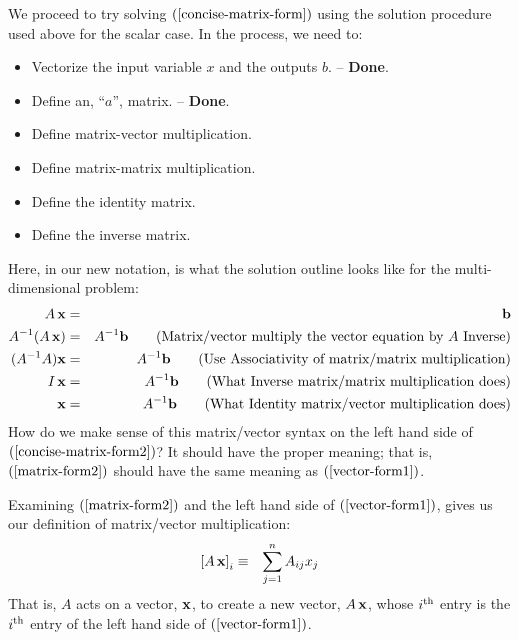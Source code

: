 \documentclass{article}
\begin{document}
We proceed to try solving $(\ref{concise-matrix-form})$ using the solution 
procedure used above for the scalar case. In the process, we need to:
\begin{itemize}
    \item{Vectorize the input variable $x$ and the outputs $b$. -- {\bf Done}.}
    \item{Define an, ``$a$'', matrix. -- {\bf Done}.}
    \item{Define matrix-vector multiplication.}
    \item{Define matrix-matrix multiplication.}
    \item{Define the identity matrix.}
    \item{Define the inverse matrix.}
\end{itemize}
Here, in our new notation, is what the solution outline looks like for the multi-dimensional problem:
\begin{eqnarray}
	A \, {\bf x} & = & {\bf b} \label{concise-matrix-form2}\\
	A^{-1} ( A \, {\bf x} ) & = & A^{-1} {\bf b} \quad \quad \text{(Matrix/vector multiply the vector equation by $A$ Inverse)} \label{inv-vec} \\
	(A^{-1} A) {\bf x} & = & A^{-1} {\bf b} \quad \quad \text{(Use Associativity of matrix/matrix multiplication)} \label{assoc-vec} \\
	I \, {\bf x} & = & A^{-1} {\bf b} \quad \quad \text{(What Inverse matrix/matrix multiplication does)} \label{inv-mult-vec} \\
	{\bf x} & = & A^{-1} {\bf b} \quad \quad \text{(What Identity matrix/vector multiplication does)} \label{identity-vec}
\end{eqnarray}
How do we make sense of this matrix/vector syntax on the left hand side of 
$(\ref{concise-matrix-form2})$? It should have
the proper meaning; that is, $(\ref{matrix-form2})$
should have the same meaning as $(\ref{vector-form1})$.

Examining $(\ref{matrix-form2})$ and the left hand side of
$(\ref{vector-form1})$, gives us our definition of matrix/vector multiplication:
\begin{eqnarray}
  \left[A \, {\bf x}\right]_i & \equiv & \sum_{j=1}^n A_{ij} x_j
                                         \label{matrix-vector-mult}
\end{eqnarray}
That is, $A$ acts on a vector, ${\bf x}$, to create a new vector, $A \, {\bf x}$,
whose $i^{\rm th}$ entry is the $i^{\rm th}$ entry of
the left hand side of $(\ref{vector-form1})$.
\end{document}
